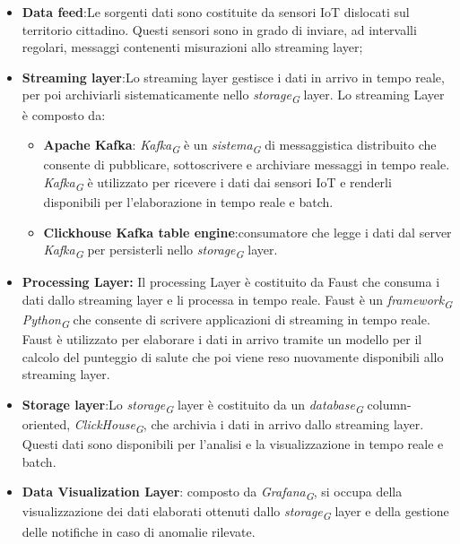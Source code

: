 \begin{itemize}
    \item \textbf{Data feed}:Le sorgenti dati sono costituite da sensori IoT dislocati sul territorio cittadino. Questi sensori sono in grado di inviare, ad intervalli regolari, messaggi contenenti misurazioni allo streaming layer;
    \item \textbf{Streaming layer}:Lo streaming layer gestisce i dati in arrivo in tempo reale, per poi archiviarli sistematicamente nello \textit{storage}\textsubscript{\textit{G}} layer. Lo streaming Layer è composto da:
    \begin{itemize}
        \item \textbf{Apache Kafka}: \textit{Kafka}\textsubscript{\textit{G}} è un \textit{sistema}\textsubscript{\textit{G}} di messaggistica distribuito che consente di pubblicare, sottoscrivere e archiviare messaggi in tempo reale. \textit{Kafka}\textsubscript{\textit{G}} è utilizzato per ricevere i dati dai sensori IoT e renderli disponibili per l'elaborazione in tempo reale e batch.
        \item \textbf{Clickhouse Kafka table engine}:consumatore che legge i
        dati dal server \textit{Kafka}\textsubscript{\textit{G}} per persisterli nello \textit{storage}\textsubscript{\textit{G}} layer.
    \end{itemize}
    \item \textbf{Processing Layer:} Il processing Layer è costituito da Faust che consuma i dati dallo streaming layer e li processa in tempo reale. Faust è un \textit{framework}\textsubscript{\textit{G}} \textit{Python}\textsubscript{\textit{G}} che consente di scrivere applicazioni di streaming in tempo reale. Faust è utilizzato per elaborare i dati in arrivo tramite un modello per il calcolo del punteggio di salute che poi viene reso nuovamente disponibili allo streaming layer.
    \item \textbf{Storage layer}:Lo \textit{storage}\textsubscript{\textit{G}} layer è costituito da un \textit{database}\textsubscript{\textit{G}} column-oriented, \textit{ClickHouse}\textsubscript{\textit{G}}, che archivia i dati in arrivo dallo streaming layer. Questi dati sono disponibili per l'analisi e la visualizzazione in tempo reale e batch.
    \item \textbf{Data Visualization Layer}: composto da \textit{Grafana}\textsubscript{\textit{G}}, si occupa della visualizzazione dei dati elaborati ottenuti dallo \textit{storage}\textsubscript{\textit{G}} layer e della gestione delle notifiche in caso di anomalie rilevate.
\end{itemize}


